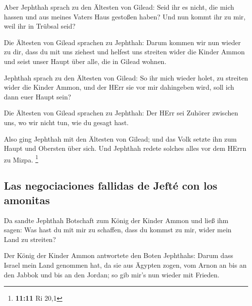  Aber Jephthah sprach zu den Ältesten von Gilead: Seid ihr
es nicht, die mich hassen und aus meines Vaters Haus gestoßen haben? Und
nun kommt ihr zu mir, weil ihr in Trübsal seid?

 Die Ältesten von Gilead sprachen zu Jephthah: Darum
kommen wir nun wieder zu dir, dass du mit uns ziehest und helfest uns
streiten wider die Kinder Ammon und seist unser Haupt über alle, die in
Gilead wohnen.

 Jephthah sprach zu den Ältesten von Gilead: So ihr mich
wieder holet, zu streiten wider die Kinder Ammon, und der HErr sie vor
mir dahingeben wird, soll ich dann euer Haupt sein?

 Die Ältesten von Gilead sprachen zu Jephthah: Der HErr
sei Zuhörer zwischen uns, wo wir nicht tun, wie du gesagt hast.

 Also ging Jephthah mit den Ältesten von Gilead; und das
Volk setzte ihn zum Haupt und Obersten über sich. Und Jephthah redete
solches alles vor dem HErrn zu Mizpa. \footnote{\textbf{11:11} Ri 20,1}

\hypertarget{las-negociaciones-fallidas-de-jeftuxe9-con-los-amonitas}{%
\subsection{Las negociaciones fallidas de Jefté con los
amonitas}\label{las-negociaciones-fallidas-de-jeftuxe9-con-los-amonitas}}

 Da sandte Jephthah Botschaft zum König der Kinder Ammon
und ließ ihm sagen: Was hast du mit mir zu schaffen, dass du kommst zu
mir, wider mein Land zu streiten?

 Der König der Kinder Ammon antwortete den Boten
Jephthahs: Darum dass Israel mein Land genommen hat, da sie aus Ägypten
zogen, vom Arnon an bis an den Jabbok und bis an den Jordan; so gib
mir's nun wieder mit Frieden.

